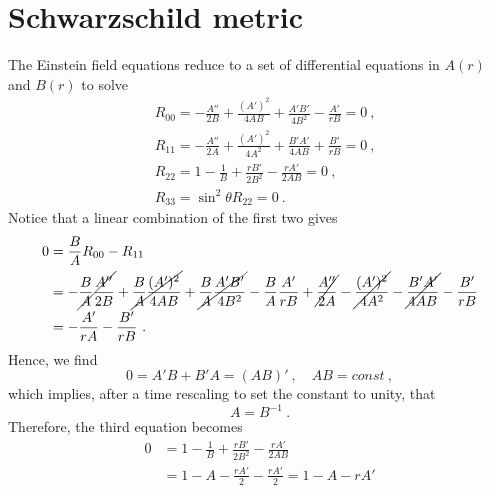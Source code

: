 \section{Schwarzschild metric}
        
    The Einstein field equations reduce to a set of differential equations in $A(r)$ and $B(r)$ to solve
    \begin{equation*}
    \begin{aligned}
        & R_{00} = - \frac{A''}{2B} + \frac{(A')^2}{4 AB} + \frac{A'B'}{4B^2} - \frac{A'}{rB}  = 0 ~,
        \\ & R_{11} = - \frac{A''}{2A} + \frac{(A')^2}{4A^2} + \frac{B'A'}{4AB} + \frac{B'}{rB} = 0 ~,
        \\ & R_{22} = 1 - \frac{1}{B} + \frac{rB'}{2B^2} - \frac{rA'}{2AB} = 0 ~,
        \\ & R_{33} = \sin^2 \theta R_{22} = 0 ~.
    \end{aligned}
    \end{equation*}
    Notice that a linear combination of the first two gives
    \begin{equation*}
    \begin{aligned}
        0 & = \frac{B}{A} R_{00} - R_{11} \\ & = - \cancel{\frac{B}{A} \frac{A''}{2B}} + \cancel{\frac{B}{A} \frac{(A')^2}{4 AB}} + \cancel{ \frac{B}{A} \frac{A'B'}{4B^2}} - \frac{B}{A} \frac{A'}{rB} + \cancel{\frac{A''}{2A}} - \cancel{\frac{(A')^2}{4A^2}} - \cancel{\frac{B'A'}{4AB}} - \frac{B'}{rB} \\ & = - \frac{A'}{rA} - \frac{B'}{rB} ~.
    \end{aligned}
    \end{equation*}
    Hence, we find
    \begin{equation*}
        0 = A' B + B' A = (AB)' ~, \quad AB = const ~,
    \end{equation*}
    which implies, after a time rescaling to set the constant to unity, that 
    \begin{equation*}
        A = B^{-1} ~.
    \end{equation*}
    Therefore, the third equation becomes 
    \begin{equation*}
    \begin{aligned}
        0 & = 1 - \frac{1}{B} + \frac{rB'}{2B^2} - \frac{rA'}{2AB} \\ & = 1 - A - \frac{rA'}{2} - \frac{rA'}{2} = 1 - A - rA' 
    \end{aligned}
    \end{equation*}

